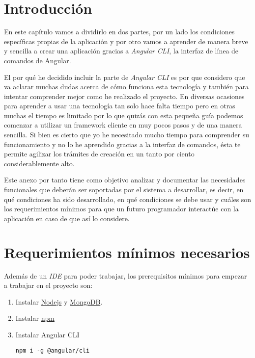 
\section{Introducción}\label{introduccion-programador}
En este capítulo vamos a dividirlo en dos partes, por un lado los condiciones específicas propias de la aplicación y por otro vamos a aprender de manera breve y sencilla a crear una aplicación gracias a \emph{Angular CLI}, la interfaz de línea de comandos de Angular.

El por qué he decidido incluir la parte de \emph{Angular CLI} es por que considero que va aclarar muchas dudas acerca de cómo funciona esta tecnología y también para intentar comprender mejor como he realizado el proyecto. En diversas ocasiones para aprender a usar una tecnología tan solo hace falta tiempo pero en otras muchas el tiempo es limitado por lo que quizás con esta pequeña guía podemos comenzar a utilizar un framework cliente en muy pocos pasos y de una manera sencilla. Si bien es cierto que yo he necesitado mucho tiempo para comprender su funcionamiento y no lo he aprendido gracias a la interfaz de comandos, ésta te permite agilizar los trámites de creación en un tanto por ciento considerablemente alto.

Este anexo por tanto tiene como objetivo analizar y documentar las necesidades funcionales que deberán ser soportadas por el sistema a desarrollar, es decir, en qué condiciones ha sido desarrollado, en qué condiciones se debe usar y cuáles son los requerimientos mínimos para que un futuro programador interactúe con la aplicación en caso de que así lo considere.

\section{Requerimientos mínimos necesarios}
Además de un \emph{IDE} para poder trabajar, los prerequisitos mínimos para empezar a trabajar en el proyecto son:

\begin{enumerate}
	\item Instalar \hyperlink{https://nodejs.org/en/}{Nodejs} y \hyperlink{https://www.mongodb.com/}{MongoDB}.
	\item Instalar \hyperlink{https://www.npmjs.com/}{npm}
	\item Instalar Angular CLI
		\lstset{language=C, breaklines=true, basicstyle=\footnotesize}
		\begin{lstlisting}[frame=single]
		npm i -g @angular/cli
    	\end{lstlisting}
\end{enumerate}


